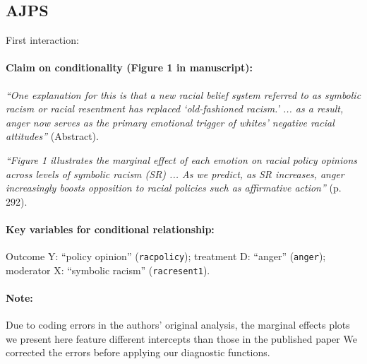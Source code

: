 \documentclass[12pt]{article}
\begin{document}
\subsection{\citet{Banks2012} AJPS} \label{banks}

First interaction:


\paragraph{Claim on conditionality (Figure 1 in manuscript):} \emph{``One explanation for this is that a new racial belief system referred to as symbolic racism or racial resentment has replaced `old-fashioned racism.' ... as a result, anger now serves as the primary emotional trigger of whites' negative racial attitudes''} (Abstract).

\emph{``Figure 1 illustrates the marginal effect of each emotion on racial policy opinions across levels of symbolic racism (SR) ... As we predict, as SR increases, anger increasingly boosts opposition to racial policies such as affirmative action''} (p. 292).

\paragraph{Key variables for conditional relationship:} Outcome Y: ``policy opinion'' (\texttt{racpolicy}); treatment D: ``anger'' (\texttt{anger}); moderator X: ``symbolic racism'' (\texttt{racresent1}).

\paragraph{Note:} Due to coding errors in the authors' original analysis, the marginal effects plots we present here feature different intercepts than those in the published paper We corrected the errors before applying our diagnostic functions.


\clearpage

\end{document}
